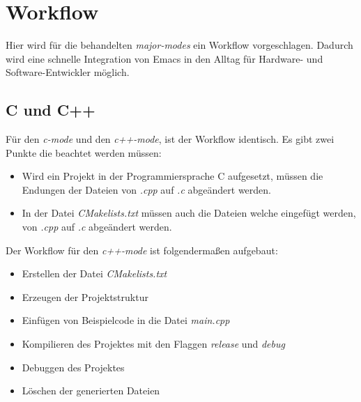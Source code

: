 \chapter{Workflow}
\label{cha:workflow}
Hier wird für die behandelten \textit{major-modes} ein Workflow
vorgeschlagen. Dadurch wird eine schnelle Integration von Emacs in den
Alltag für Hardware- und Software-Entwickler möglich.\\

\section{C und C++}
\label{sec:c++}
Für den \textit{c-mode} und den \textit{c++-mode}, ist der Workflow
identisch. Es gibt zwei Punkte die beachtet werden müssen:
\begin{itemize}
\item Wird ein Projekt in der Programmiersprache C aufgesetzt, müssen
  die Endungen der Dateien von \textit{.cpp} auf \textit{.c}
  abgeändert werden.
\item In der Datei \textit{CMakelists.txt} müssen auch die Dateien
  welche eingefügt werden, von \textit{.cpp} auf \textit{.c}
  abgeändert werden.
\end{itemize}
Der Workflow für den \textit{c++-mode} ist folgendermaßen aufgebaut:
\begin{itemize}
\item Erstellen der Datei \textit{CMakelists.txt}
\item Erzeugen der Projektstruktur
\item Einfügen von Beispielcode in die Datei \textit{main.cpp}
\item Kompilieren des Projektes mit den Flaggen \textit{release} und
  \textit{debug}
\item Debuggen des Projektes
\item Löschen der generierten Dateien
\end{itemize}


